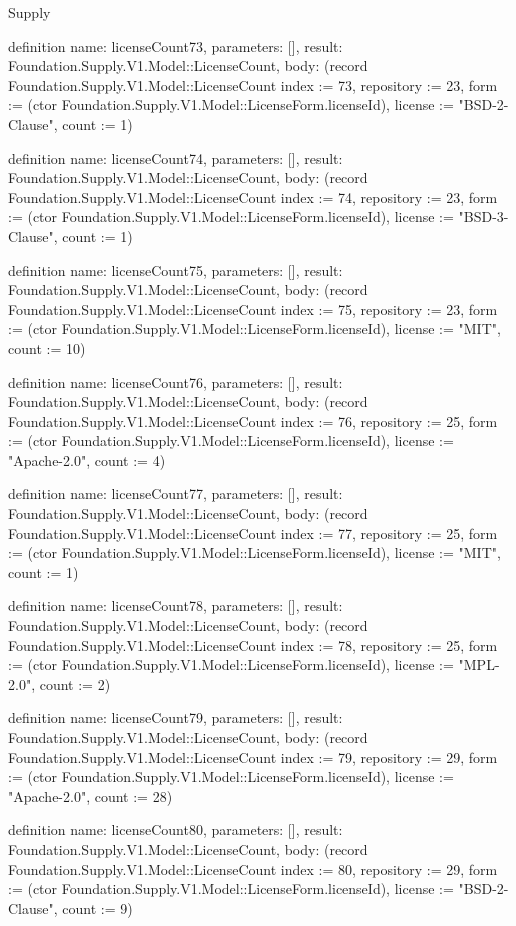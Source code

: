\begin{lexlean}{Supply}
\begin{semanticmodule}
definition{
  name: licenseCount73,
  parameters: [],
  result: Foundation.Supply.V1.Model::LicenseCount,
  body: (record Foundation.Supply.V1.Model::LicenseCount {index := 73, repository := 23, form := (ctor Foundation.Supply.V1.Model::LicenseForm.licenseId), license := "BSD-2-Clause", count := 1})
}

definition{
  name: licenseCount74,
  parameters: [],
  result: Foundation.Supply.V1.Model::LicenseCount,
  body: (record Foundation.Supply.V1.Model::LicenseCount {index := 74, repository := 23, form := (ctor Foundation.Supply.V1.Model::LicenseForm.licenseId), license := "BSD-3-Clause", count := 1})
}

definition{
  name: licenseCount75,
  parameters: [],
  result: Foundation.Supply.V1.Model::LicenseCount,
  body: (record Foundation.Supply.V1.Model::LicenseCount {index := 75, repository := 23, form := (ctor Foundation.Supply.V1.Model::LicenseForm.licenseId), license := "MIT", count := 10})
}

definition{
  name: licenseCount76,
  parameters: [],
  result: Foundation.Supply.V1.Model::LicenseCount,
  body: (record Foundation.Supply.V1.Model::LicenseCount {index := 76, repository := 25, form := (ctor Foundation.Supply.V1.Model::LicenseForm.licenseId), license := "Apache-2.0", count := 4})
}

definition{
  name: licenseCount77,
  parameters: [],
  result: Foundation.Supply.V1.Model::LicenseCount,
  body: (record Foundation.Supply.V1.Model::LicenseCount {index := 77, repository := 25, form := (ctor Foundation.Supply.V1.Model::LicenseForm.licenseId), license := "MIT", count := 1})
}

definition{
  name: licenseCount78,
  parameters: [],
  result: Foundation.Supply.V1.Model::LicenseCount,
  body: (record Foundation.Supply.V1.Model::LicenseCount {index := 78, repository := 25, form := (ctor Foundation.Supply.V1.Model::LicenseForm.licenseId), license := "MPL-2.0", count := 2})
}

definition{
  name: licenseCount79,
  parameters: [],
  result: Foundation.Supply.V1.Model::LicenseCount,
  body: (record Foundation.Supply.V1.Model::LicenseCount {index := 79, repository := 29, form := (ctor Foundation.Supply.V1.Model::LicenseForm.licenseId), license := "Apache-2.0", count := 28})
}

definition{
  name: licenseCount80,
  parameters: [],
  result: Foundation.Supply.V1.Model::LicenseCount,
  body: (record Foundation.Supply.V1.Model::LicenseCount {index := 80, repository := 29, form := (ctor Foundation.Supply.V1.Model::LicenseForm.licenseId), license := "BSD-2-Clause", count := 9})
}


\end{semanticmodule}
\end{lexlean}
